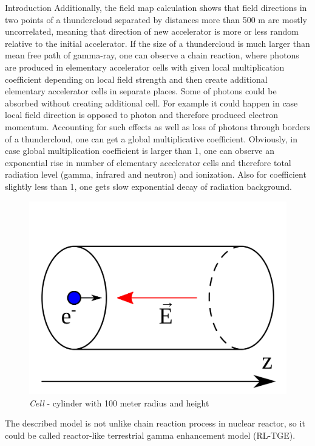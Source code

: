 \documentclass[final,hyperref={pdfpagelabels=false}]{beamer}
\begin{document}
\begin{frame}{}
\begin{columns}[t]
\begin{column}{0.32\linewidth}
\begin{block}{Introduction}
                    Additionally, the field map calculation shows that field directions in two points of a thundercloud separated by distances more than 500 m are mostly uncorrelated, meaning that direction of new accelerator is more or less random relative to the initial accelerator.
                    If the size of a thundercloud is much larger than mean free path of gamma-ray, one can observe a chain reaction, where photons are produced in elementary accelerator cells with given local multiplication coefficient depending on local field strength and then create additional elementary accelerator cells in separate places. Some of photons could be absorbed without creating additional cell. For example it could happen in case local field direction is opposed to photon and therefore produced electron momentum. Accounting for such effects as well as loss of photons through borders of a thundercloud, one can get a global multiplicative coefficient. Obviously, in case global multiplication coefficient is larger than 1, one can observe an exponential rise in number of elementary accelerator cells and therefore total radiation level (gamma, infrared and neutron) and ionization. Also for coefficient slightly less than 1, one gets slow exponential decay of radiation background.
                    \begin{figure}[htb]
                        \centering
                        \includegraphics[width=1\columnwidth]{cell.pdf}
                        \caption{\textit{Cell} - cylinder with 100 meter radius and height }
                    \end{figure}
                    The described model is not unlike chain reaction process in nuclear reactor, so it could be called reactor-like terrestrial gamma enhancement model (RL-TGE).
                \end{block}
                

\end{column}
\end{columns}
\end{frame}
\end{document}
